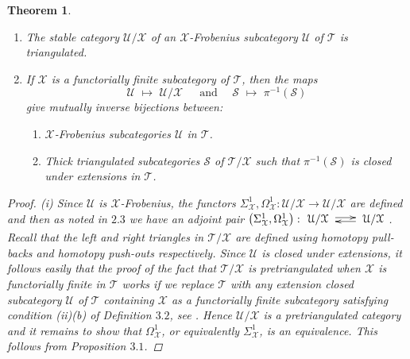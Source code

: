 \documentclass[oneside, a4paper,reqno]{amsart}
\numberwithin{equation}{section}
\newtheorem{thm}{Theorem}[section]
\theoremstyle{definition}
\begin{document}
\begin{thm} \begin{enumerate}
\item[$\mathrm{(i)}$] The stable category ${\mathcal U}/{\mathcal X}$ of an ${\mathcal X}$-Frobenius subcategory ${\mathcal U}$ of ${\mathcal T}$ is triangulated.  
\item[$\mathrm{(ii)}$] If ${\mathcal X}$ is a functorially finite subcategory of ${\mathcal T}$, then the maps 
\[
{\mathcal U} \,\, \longmapsto \,\, {\mathcal U}/{\mathcal X} \,\,\,\,\,\,\,\,\, \text{and} \,\,\,\,\,\,\,\, \mathcal S \,\, \longmapsto \,\,    \pi^{-1}(\mathcal S)
\]
give mutually inverse bijections between:
\begin{enumerate}
\item[$\mathsf{(I)}$] ${\mathcal X}$-Frobenius subcategories ${\mathcal U}$ in ${\mathcal T}$.
\item[$\mathsf{(II)}$] Thick triangulated subcategories $\mathcal S$ of ${\mathcal T}/{\mathcal X}$ such that $\pi^{-1}(\mathcal S)$ is closed under extensions in ${\mathcal T}$.   
\end{enumerate} 
\end{enumerate}
\begin{proof} (i)  Since ${\mathcal U}$ is ${\mathcal X}$-Frobenius, the functors $\Sigma^{1}_{\mathcal X}, \Omega^{1}_{\mathcal X} \colon {\mathcal U}/{\mathcal X} {\longrightarrow} {\mathcal U}/{\mathcal X}$ are defined and then as noted in $2.3$ we have an adjoint pair $
\big(\Sigma^{1}_{\mathcal X},\Omega^{1}_{\mathcal X}\big) \, \colon  \xymatrix@C=1.5pc {{\mathcal U}/{\mathcal X} \ \ar@<0.4ex>[r]^-{{\mathsf{}}} &  \ar@<0.4ex>[l]^-{{\mathsf{}}} \ {\mathcal U}/{\mathcal X}}$. Recall that the left and right triangles in ${\mathcal T}/{\mathcal X}$ are defined using homotopy pull-backs and homotopy push-outs respectively. Since ${\mathcal U}$ is closed under extensions, it follows easily that the proof of the fact that ${\mathcal T}/{\mathcal X}$ is pretriangulated when ${\mathcal X}$ is functorially finite in ${\mathcal T}$ works if we replace ${\mathcal T}$ with any extension closed subcategory ${\mathcal U}$ of ${\mathcal T}$ containing ${\mathcal X}$ as a functorially finite subcategory satisfying condition (ii)(b) of Definition $3.2$, see \cite{B:3cats, B, PJ}.  Hence ${\mathcal U}/{\mathcal X}$ is a pretriangulated category and it remains to show that $\Omega^{1}_{\mathcal X}$, or equivalently $\Sigma^{1}_{\mathcal X}$, is an equivalence.  This follows from Proposition $3.1$. 


\end{proof}
\end{thm}
\end{document}
